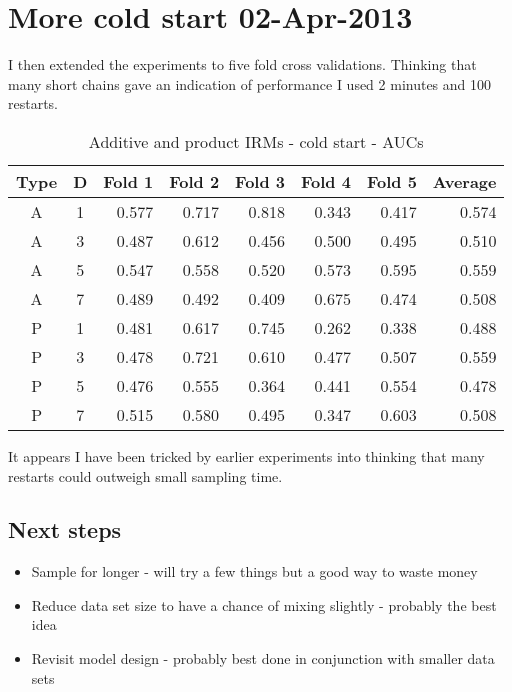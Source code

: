 \documentclass[twoside,11pt]{article}
\begin{document}
\section{More cold start 02-Apr-2013}

I then extended the experiments to five fold cross validations.
Thinking that many short chains gave an indication of performance I used 2 minutes and 100 restarts.

\begin{table*}[ht!]
\caption{{\small
Additive and product IRMs - cold start - AUCs
}}
\label{tbl:IRM 02-Apr-2013}
\begin{center}
\begin{tabular}{c c | r r r r r | r}
Type & D & Fold 1 & Fold 2 & Fold 3 & Fold 4 & Fold 5 & Average \\
\hline
A & 1 & 0.577 & 0.717 & 0.818 & 0.343 & 0.417 & 0.574\\
A & 3 & 0.487 & 0.612 & 0.456 & 0.500 & 0.495 & 0.510\\
A & 5 & 0.547 & 0.558 & 0.520 & 0.573 & 0.595 & 0.559\\
A & 7 & 0.489 & 0.492 & 0.409 & 0.675 & 0.474 & 0.508\\
P & 1 & 0.481 & 0.617 & 0.745 & 0.262 & 0.338 & 0.488\\
P & 3 & 0.478 & 0.721 & 0.610 & 0.477 & 0.507 & 0.559\\
P & 5 & 0.476 & 0.555 & 0.364 & 0.441 & 0.554 & 0.478\\
P & 7 & 0.515 & 0.580 & 0.495 & 0.347 & 0.603 & 0.508\\
\end{tabular}
\end{center}
\end{table*}

It appears I have been tricked by earlier experiments into thinking that many restarts could outweigh small sampling time.

\subsection{Next steps}

\begin{itemize}
\item Sample for longer - will try a few things but a good way to waste money
\item Reduce data set size to have a chance of mixing slightly - probably the best idea
\item Revisit model design - probably best done in conjunction with smaller data sets
\end{itemize}
\end{document}
